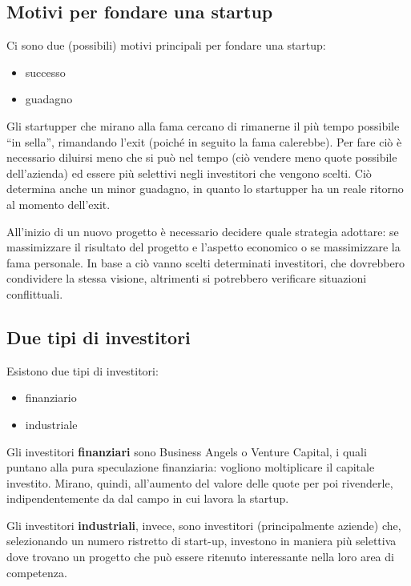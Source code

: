 \subsection{Motivi per fondare una startup}
Ci sono due (possibili) motivi principali per fondare una startup:
\begin{itemize}
 \item successo
 \item guadagno
\end{itemize}

Gli startupper che mirano alla fama cercano di rimanerne il più tempo possibile
``in sella'', rimandando l'exit (poiché in seguito la fama calerebbe). Per fare 
ciò è necessario diluirsi meno che si può nel tempo (ciò vendere meno quote 
possibile dell'azienda) ed essere più selettivi negli investitori che vengono 
scelti. Ciò determina anche un minor guadagno, in quanto lo startupper ha un 
reale ritorno al momento dell'exit.

All'inizio di un nuovo progetto è necessario decidere quale strategia adottare:
se massimizzare il risultato del progetto e l'aspetto economico o se
massimizzare la fama personale. In base a ciò vanno scelti determinati
investitori, che dovrebbero condividere la stessa visione, altrimenti si
potrebbero verificare situazioni conflittuali.

\subsection{Due tipi di investitori}

Esistono due tipi di investitori:
\begin{itemize}
 \item finanziario
 \item industriale
\end{itemize}

Gli investitori \textbf{finanziari} sono Business Angels o Venture Capital, i
quali puntano alla pura speculazione finanziaria: vogliono moltiplicare il
capitale investito. Mirano, quindi, all'aumento del valore delle quote per poi
rivenderle, indipendentemente da dal campo in cui lavora la startup. 

Gli investitori \textbf{industriali}, invece, sono investitori (principalmente
aziende) che, selezionando un numero ristretto di start-up, investono in
maniera più selettiva dove trovano un progetto che può essere ritenuto
interessante nella loro area di competenza.

